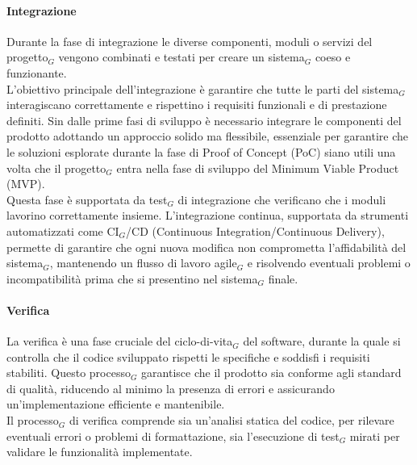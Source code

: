 \documentclass[10pt]{article}
\begin{document}
\begin{justify}
        \paragraph{Integrazione}
        Durante la fase di integrazione le diverse componenti, moduli o servizi del progetto$_G$ vengono combinati e testati per creare un sistema$_G$ coeso e funzionante.\\
        L'obiettivo principale dell'integrazione è garantire che tutte le parti del sistema$_G$ interagiscano correttamente e rispettino i requisiti funzionali e di prestazione definiti.
        Sin dalle prime fasi di sviluppo è necessario integrare le componenti del prodotto adottando un approccio solido ma flessibile, essenziale per garantire che le soluzioni esplorate durante la fase di Proof of Concept (PoC) siano utili una volta che il progetto$_G$ entra nella fase di sviluppo del Minimum Viable Product (MVP).\\
        Questa fase è supportata da test$_G$ di integrazione che verificano che i moduli lavorino correttamente insieme. L'integrazione continua, supportata da strumenti automatizzati come CI$_G$/CD (Continuous Integration/Continuous Delivery), permette di garantire che ogni nuova modifica non comprometta l'affidabilità del sistema$_G$, mantenendo un flusso di lavoro agile$_G$ e risolvendo eventuali problemi o incompatibilità prima che si presentino nel sistema$_G$ finale.\\

        \paragraph{Verifica}
        La verifica è una fase cruciale del ciclo-di-vita$_G$ del software, durante la quale si controlla che il codice sviluppato rispetti le specifiche e soddisfi i requisiti stabiliti. Questo processo$_G$ garantisce che il prodotto sia conforme agli standard di qualità, riducendo al minimo la presenza di errori e assicurando un'implementazione efficiente e mantenibile.\\
        Il processo$_G$ di verifica comprende sia un'analisi statica del codice, per rilevare eventuali errori o problemi di formattazione, sia l'esecuzione di test$_G$ mirati per validare le funzionalità implementate.\\


\end{justify}
\end{document}

